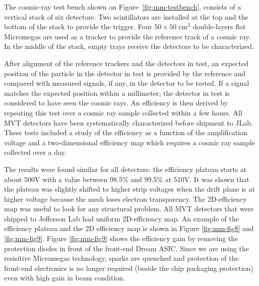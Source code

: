 The cosmic-ray test bench shown on Figure~\ref{fig:mm-testbench}, consists of a vertical stack of six detectors. Two scintillators are installed at the top and the bottom of the stack to provide the trigger. Four $50 \times 50 \text{ cm}^2$ double-layers flat Micromegas are used as a tracker to provide the reference track of a cosmic ray. In the middle of the stack, empty trays receive the detectors to be characterized.

After alignment of the reference trackers and the detectors in test, an expected position of the particle in the detector in test is provided by the reference and compared with measured signals, if any, in the detector to be tested. If a signal matches the expected position within a millimeter, the detector in test is considered to have seen the cosmic rays. An efficiency is then derived by repeating this test over a cosmic ray sample collected within a few hours. All MVT detectors have been systematically characterized before shipment to JLab. These tests included a study of the efficiency as a 
function of the amplification voltage and a two-dimensional efficiency map which requires a cosmic ray sample collected over a day.

The results were found similar for all detectors: the efficiency plateau starts at about 500V with a value between 98.5\% and 99.5\% at 510V. It was shown that the plateau was slightly shifted to higher strip voltages when the drift plane is at higher voltage because the mesh loses electron transparency. The 2D-efficiency map was useful to look for any structural problem. All MVT detectors that were shipped to Jefferson Lab had uniform 2D-efficiency map. An example of the efficiency plateau and the 2D efficiency map is shown in Figure \ref{fig:mm-fig8} and \ref{fig:mm-fig9}. Figure \ref{fig:mm-fig9} shows the efficiency gain by removing the protection diodes in front of the front-end Dream ASIC. Since we are using the resisitive Micromegas technology, sparks are quenched and protection of the front-end electronics is no longer required (beside the chip packaging protection) even with high gain in beam condition.

